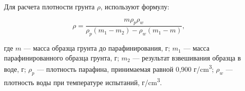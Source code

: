 Для расчета плотности грунта  $\rho$,  используют формулу: 

\[
   \rho = \frac{m \rho_p \rho_w}{\rho_p (m_1-m_2)-\rho_w (m_1-m)} \text{,}
\]

где $m$ --- масса образца грунта до парафинирования, г;
$m_1$ --- масса парафинированного образца грунта, г;
$m_2$ --- результат взвешивания образца в воде, г; 
$\rho_p$ --- плотность парафина, принимаемая равной 0,900 г/\si{\centi\meter^3};
$\rho_w$ --- плотность воды при температуре испытаний,  г/\si{\centi\meter^3}.


%
%
%
%
